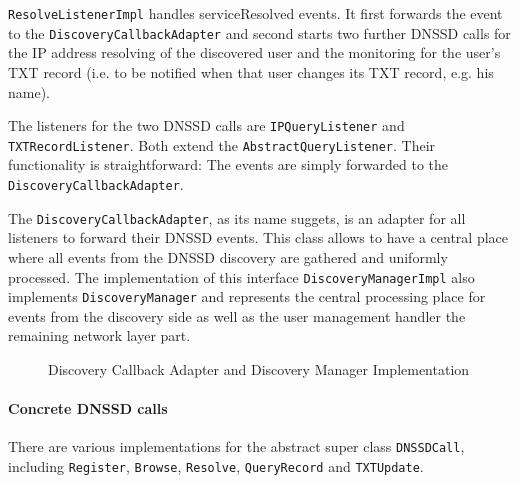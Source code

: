 \texttt{ResolveListenerImpl} handles serviceResolved events. It first forwards the event to the \texttt{DiscoveryCallbackAdapter} and second starts two further DNSSD calls for the IP address resolving of the discovered user and the monitoring for the user's TXT record (i.e. to be notified when that user changes its TXT record, e.g. his name).

The listeners for the two DNSSD calls are \texttt{IPQueryListener} and \texttt{TXTRecordListener}. Both extend the \texttt{AbstractQueryListener}. Their functionality is straightforward: The events are simply forwarded to the \texttt{DiscoveryCallbackAdapter}.

The \texttt{DiscoveryCallbackAdapter}, as its name suggets, is an adapter for all listeners to forward their DNSSD events. This class allows to have a central place where all events from the DNSSD discovery are gathered and uniformly processed. The implementation of this interface \texttt{DiscoveryManagerImpl} also implements \texttt{DiscoveryManager} and represents the central processing place for events from the discovery side as well as the user management handler the remaining network layer part.

\begin{figure}[H]
 \centering
 \caption{Discovery Callback Adapter and Discovery Manager Implementation}
 \label{fig:network.discovery.managerandadapter}
\end{figure}


\paragraph{Concrete DNSSD calls}
There are various implementations for the abstract super class \texttt{DNSSDCall}, including \texttt{Register}, \texttt{Browse}, \texttt{Resolve}, \texttt{QueryRecord} and \texttt{TXTUpdate}.

